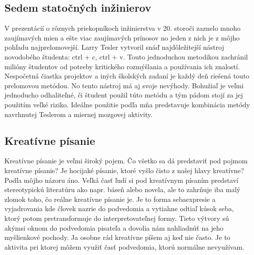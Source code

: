 \documentclass[10pt,twoside,slovak,a4paper]{article}
\begin{document}
\subsection{Sedem statočných inžinierov}
V prezentácií o rôznych priekopníkoch inžinierstva v 20. storoči zaznelo mnoho zaujímavých mien a ešte viac zaujímavých prínosov no jeden z nich je z môjho pohľadu najprelomovejší. Larry Tesler vytvoril snáď najdôležitejší nástroj novodobého študenta: ctrl + c, ctrl + v. Touto jednoduchou metodikou zachránil milióny študentov od potreby kritického rozmýšlania a používania ich znalostí. Nespočetná čiastka projektov a iných školských zadaní je každý deň riešená touto prelomovou metódou. No tento nástroj má aj svoje nevýhody. Bohužiaľ je veľmi jednoducho odhaliteľné, či študent použil túto metódu a tým pádom stojí za jej použitím veľké riziko. Ideálne použitie podľa mňa predstavuje kombinácia metódy navrhnutej Teslerom a miernej mozgovej aktivity.

\subsection{Kreatívne písanie}
Kreatívne písanie je veľmi široký pojem. Čo všetko sa dá predstaviť pod pojmom kreatívne písanie? Je hocijaké písanie, ktoré vyšlo čisto z našej hlavy kreatívne? Podľa môjho názoru áno. Veľká časť ľudí si pod kreatívnym písaním predstaví stereotypickú literatúru ako napr. báseň alebo novela, ale to zahrňuje iba malý zlomok toho, čo reálne kreatívne písanie je. Je to forma sebaexpresie a vyjadrovania kde človek nazrie do podvedomia a vytiahne odtiaľ kúsok seba, ktorý potom pretransformuje do interpretovateľnej formy. Tieto výtvory sú akýmsi oknom do podvedomia pisateľa a dovolia nám nahliadnúť na jeho myšlienkové pochody. Ja osobne rád kreatívne píšem aj keď nie často. Je to aktivita pri ktorej môžem využiť časť podvedomia, ktorú normálne nevyužívam.
\end{document}
